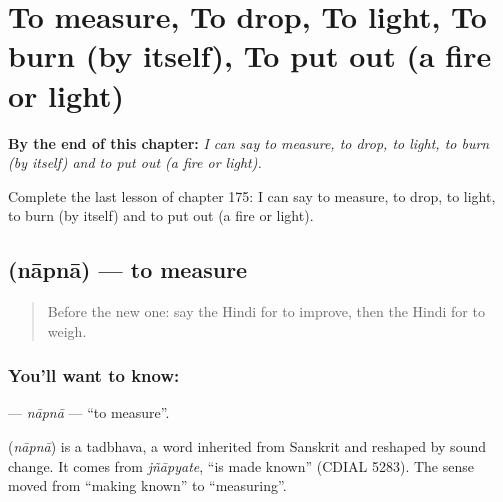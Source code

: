 
\chapter{To measure, To drop, To light, To burn (by itself), To put out (a fire or light)}
\label{ch:hi-to-measure-to-drop-to-light-to-burn-by-itself-to-put-out-a-fire-or-light}

\begin{chapteropening}
\textbf{By the end of this chapter:} \emph{I can say to measure, to drop, to light, to burn (by itself) and to put out (a fire or light).}

Complete the last lesson of chapter 175: I can say to measure, to drop, to light, to burn (by itself) and to put out (a fire or light).
\end{chapteropening}

\section[\texorpdfstring{\hi{नापना} (nāpnā)}{नापना (nāpnā)}]{ (nāpnā) — to measure}

\label{lesson:HI-C175-napna}



\begin{quote}
Before the new one: say the Hindi for to improve, then the Hindi for to weigh.
\end{quote}

\subsection*{You'll want to know: }
\textbf{} — \emph{nāpnā} — \textquotedblleft{}to measure\textquotedblright{}.

\begin{cousinweb}
\textbf{} (\emph{nāpnā}) is a tadbhava, a word inherited from Sanskrit and reshaped by sound change. It comes from \emph{jñāpyate}, \textquotedblleft{}is made known\textquotedblright{} (CDIAL 5283). The sense moved from \textquotedblleft{}making known\textquotedblright{} to \textquotedblleft{}measuring\textquotedblright{}.
\end{cousinweb}

